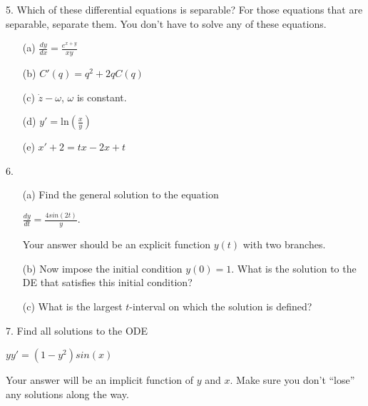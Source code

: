 \documentclass[12pt,letterpaper]{hmcpset}
\begin{document}
\begin{problem}
5. Which of these differential equations is separable? For those equations that are separable,
separate them. You don’t have to solve any of these equations.\\
\begin{enumerate}
    \item[(a)] $\frac{dy}{dx}=\frac{e^{x+y}}{xy}$
    \item[(b)] $C'(q)=q^2+2qC(q)$
    \item[(c)] $\dot{z}-\omega$, $\omega$ is constant.
    \item[(d)] $y'=$ln$(\frac{x}{y})$
    \item[(e)] $x'+2=tx-2x+t$
\end{enumerate}

\end{problem}
\newpage
\begin{problem}
6. 
\begin{enumerate}
    \item[(a)] Find the general solution to the equation\\
\begin{center}
    $\frac{dy}{dt}=\frac{4sin(2t)}{y}$.
\end{center}
Your answer should be an explicit function $y(t)$ with two branches.
    \item[(b)] Now impose the initial condition $y(0) = 1$. What is the solution to the DE that satisfies
this initial condition?
    \item[(c)] What is the largest $t$-interval on which the solution is defined?
\end{enumerate}

\end{problem}
\newpage

\begin{problem}
7. Find all solutions to the ODE
\begin{center}
    $yy'=(1-y^2)sin(x)$
\end{center}
Your answer will be an implicit function of $y$ and $x$. Make sure you don’t “lose” any solutions
along the way.
\end{problem}
\newpage
\end{document}
